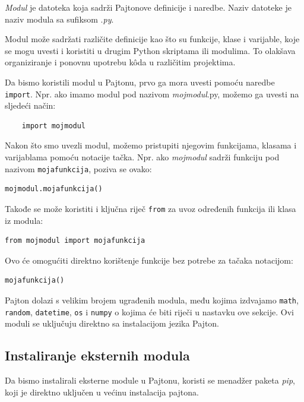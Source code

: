 \textit{Modul} je datoteka koja sadrži Pajtonove definicije i naredbe. Naziv datoteke je naziv modula sa sufiksom .\textit{py}.

Modul može sadržati različite definicije kao što su funkcije, klase i varijable, koje se mogu uvesti i koristiti u drugim Python skriptama ili modulima. To olakšava organiziranje i ponovnu upotrebu k\^oda u različitim projektima.

Da bismo koristili modul u Pajtonu, prvo ga mora uvesti pomoću naredbe \texttt{import}. Npr. ako imamo modul pod nazivom \textit{mojmodul}.py, možemo ga uvesti na sljedeći način:
\begin{verbatim}
	import mojmodul
\end{verbatim}


Nakon što smo uvezli modul, možemo pristupiti njegovim funkcijama, klasama i varijablama pomoću notacije tačka. Npr. ako \textit{mojmodul} sadrži funkciju pod nazivom \texttt{mojafunkcija}, poziva se ovako:
\begin{verbatim}
mojmodul.mojafunkcija()
\end{verbatim}

Takođe se može koristiti i ključna riječ \texttt{from} za uvoz određenih funkcija ili klasa iz modula:
\begin{verbatim}
from mojmodul import mojafunkcija
\end{verbatim}

Ovo će omogućiti direktno korištenje funkcije bez potrebe za tačaka notacijom:

\begin{verbatim}
mojafunkcija()

\end{verbatim}

Pajton dolazi s velikim brojem ugrađenih modula, među kojima izdvajamo \texttt{math}, \texttt{random}, \texttt{datetime}, \texttt{os} i \texttt{numpy} o kojima će biti riječi u nastavku ove sekcije. Ovi moduli se uključuju direktno sa instalacijom jezika Pajton.
 

\subsection{Instaliranje eksternih modula} 


Da bismo instalirali eksterne module u Pajtonu,   koristi se menadžer paketa \textit{pip}, koji je direktno uključen u većinu instalacija pajtona. 

